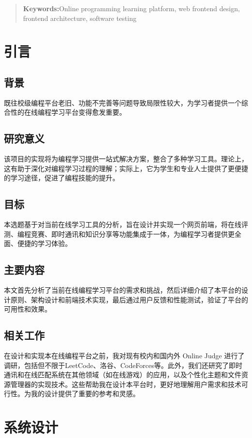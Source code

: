 \documentclass[12pt,a4paper]{article}
\begin{document}
\begin{CJK*}{UTF8}{gbsn}
\begin{abstract}
\vspace{1em}
\noindent \textbf{Keywords:}Online programming learning platform, web frontend design, frontend architecture, software testing
\end{abstract}

\newpage
\tableofcontents

\newpage
\section{引言}
\subsection{背景}
既往校级编程平台老旧、功能不完善等问题导致局限性较大，为学习者提供一个综合性的在线编程学习平台变得愈发重要。
\subsection{研究意义}
该项目的实现将为编程学习提供一站式解决方案，整合了多种学习工具。理论上，这有助于深化对编程学习过程的理解；实际上，它为学生和专业人士提供了更便捷的学习途径，促进了编程技能的提升。
\subsection{目标}
本选题基于对当前在线学习工具的分析，旨在设计并实现一个网页前端，将在线评测、编程竞赛、即时通讯和知识分享等功能集成于一体，为编程学习者提供更全面、便捷的学习体验。
\subsection{主要内容}
本文首先分析了当前在线编程学习平台的需求和挑战，然后详细介绍了本平台的设计原则、架构设计和前端技术实现，最后通过用户反馈和性能测试，验证了平台的可用性和效果。
\subsection{相关工作}
在设计和实现本在线编程平台之前，我对现有校内和国内外 Online Judge 进行了调研，包括但不限于LeetCode、洛谷、CodeForces等。此外，我们还研究了即时通讯和在线匹配系统在其他领域（如在线游戏）的应用，以及个性化主题和文件资源管理器的实现技术。这些帮助我在设计本平台时，更好地理解用户需求和技术可行性。为我的设计提供了重要的参考和灵感。

\section{系统设计}


\end{CJK*}
\end{document}
